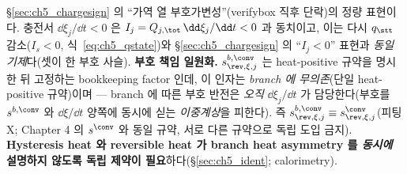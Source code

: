 \S\ref{sec:ch5_chargesign} 의 ``가역 열 부호가변성''(verifybox 직후 단락)의 정량 표현이다. 충전서 $\dd\xi_j/\dd t<0$
은 $I_j=Q_{j,\tot}\,\dd\xi_j/\dd t<0$ 과 동치이고, 이는 다시 $q_\stt$ 감소($I_s<0$, 식~\eqref{eq:ch5_qstate})와
\S\ref{sec:ch5_chargesign} 의 ``$I_j<0$'' 표현과 \emph{동일 기제}다(셋이 한 부호 사슬). \textbf{부호 책임 일원화.}
$s_{\rev,\xi,j}^{b,\conv}$ 는 heat-positive 규약을 명시한 뒤 고정하는 bookkeeping factor 인데, 이 인자는
\emph{branch 에 무의존}(단일 heat-positive 규약)이며 — branch 에 따른 부호 반전은 \emph{오직} $\dd\xi_j/\dd t$ 가
담당한다(부호를 $s^{b,\conv}$ 와 $\dd\xi/\dd t$ 양쪽에 동시에 싣는 \emph{이중계상}을 피한다). 즉
$s_{\rev,\xi,j}^{b,\conv}\equiv s_{\rev,\xi,j}^{\conv}$(피팅 X; Chapter 4 의 $s^\conv$ 와 동일 규약, 서로 다른
규약으로 독립 도입 금지). \textbf{Hysteresis heat 와 reversible heat 가 branch heat asymmetry 를
\emph{동시에} 설명하지 않도록 독립 제약이 필요}하다(\S\ref{sec:ch5_ident}; calorimetry).

